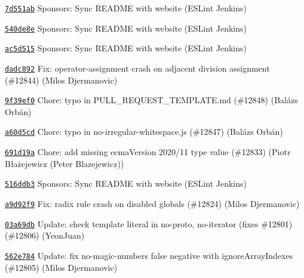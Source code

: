 \begin{DoxyItemize}
\item \href{https://github.com/eslint/eslint/commit/7d551ab8cbf2d3a802b0d0685379aa075fe9d7c0}{\texttt{ {\ttfamily 7d551ab}}} Sponsors\+: Sync README with website (ESLint Jenkins)
\item \href{https://github.com/eslint/eslint/commit/540de8e34d08f4b17b66b06d13927acb7552357a}{\texttt{ {\ttfamily 540de8e}}} Sponsors\+: Sync README with website (ESLint Jenkins)
\item \href{https://github.com/eslint/eslint/commit/ac5d515252c226f030fa646bf7635a12a3b856fe}{\texttt{ {\ttfamily ac5d515}}} Sponsors\+: Sync README with website (ESLint Jenkins)
\item \href{https://github.com/eslint/eslint/commit/dadc8927820576c60b48bcbc7d5a9056a6279d30}{\texttt{ {\ttfamily dadc892}}} Fix\+: operator-\/assignment crash on adjacent division assignment (\#12844) (Milos Djermanovic)
\item \href{https://github.com/eslint/eslint/commit/9f39ef0d4b398c7c09ceef89128da448680d587c}{\texttt{ {\ttfamily 9f39ef0}}} Chore\+: typo in PULL\+\_\+\+REQUEST\+\_\+\+TEMPLATE.\+md (\#12848) (Balázs Orbán)
\item \href{https://github.com/eslint/eslint/commit/a60d5cd2325ca72fa1b272b0b90ccd7904b92062}{\texttt{ {\ttfamily a60d5cd}}} Chore\+: typo in no-\/irregular-\/whitespace.\+js (\#12847) (Balázs Orbán)
\item \href{https://github.com/eslint/eslint/commit/691d19a2872bffab50c0024d488b8cb33504cc83}{\texttt{ {\ttfamily 691d19a}}} Chore\+: add missing {\ttfamily ecma\+Version} 2020/11 type value (\#12833) (Piotr Błażejewicz (Peter Blazejewicz))
\item \href{https://github.com/eslint/eslint/commit/516ddb37d39502e5a8c88a017ae3bad05046f41d}{\texttt{ {\ttfamily 516ddb3}}} Sponsors\+: Sync README with website (ESLint Jenkins)
\item \href{https://github.com/eslint/eslint/commit/a9d92f991d69902a9150db373590e2ed54dec988}{\texttt{ {\ttfamily a9d92f9}}} Fix\+: radix rule crash on disabled globals (\#12824) (Milos Djermanovic)
\item \href{https://github.com/eslint/eslint/commit/03a69dbe86d5b5768a310105416ae726822e3c1c}{\texttt{ {\ttfamily 03a69db}}} Update\+: check template literal in no-\/proto, no-\/iterator (fixes \#12801) (\#12806) (Yeon\+Juan)
\item \href{https://github.com/eslint/eslint/commit/562e7845946a490f2e173a0bcd1af631070a4eef}{\texttt{ {\ttfamily 562e784}}} Update\+: fix no-\/magic-\/numbers false negative with ignore\+Array\+Indexes (\#12805) (Milos Djermanovic)

\end{DoxyItemize}
